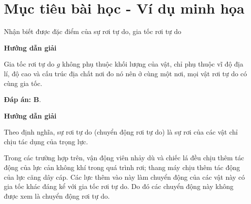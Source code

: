 \section{Mục tiêu bài học - Ví dụ minh họa}
\begin{dang}{Nhận biết được đặc điểm của sự rơi tự do, gia tốc rơi tự do}
	{	\begin{center}
			\textbf{Hướng dẫn giải}
		\end{center}
		
		Gia tốc rơi tự do $g$ không phụ thuộc khối lượng của vật, chỉ phụ thuộc vĩ độ địa lí, độ cao và cấu trúc địa chất nơi đo nó nên ở cùng một nơi, mọi vật rơi tự do có cùng gia tốc.
		
		\textbf{Đáp án: B}.
	}
	{	\begin{center}
			\textbf{Hướng dẫn giải}
		\end{center}
		
		Theo định nghĩa, sự rơi tự do (chuyển động rơi tự do) là sự rơi của các vật chỉ chịu tác dụng của trọng lực.
		
		Trong các trường hợp trên, vận động viên nhảy dù và chiếc lá đều chịu thêm tác động của lực cản không khí trong quá trình rơi; thang máy chịu thêm tác động của lực căng dây cáp. Các lực thêm vào này làm chuyển động của các vật này có gia tốc khác đáng kể với gia tốc rơi tự do. Do đó các  chuyển động này không được xem là chuyển động rơi tự do. 
		
}
\end{dang}
